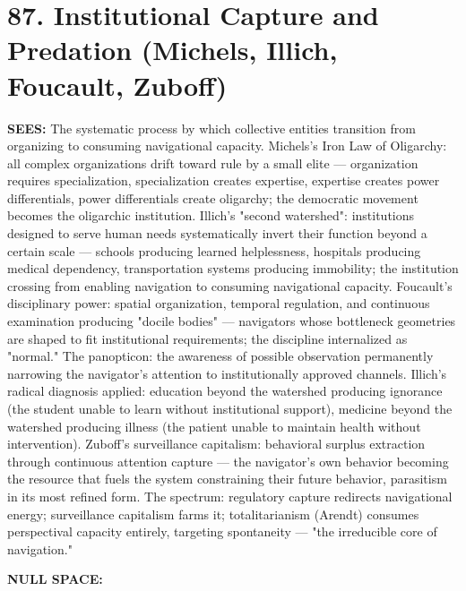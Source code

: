 \section*{87. Institutional Capture and Predation (Michels, Illich, Foucault, Zuboff)}


\textbf{SEES:} The systematic process by which collective entities transition from organizing to consuming navigational capacity. Michels's Iron Law of Oligarchy: all complex organizations drift toward rule by a small elite — organization requires specialization, specialization creates expertise, expertise creates power differentials, power differentials create oligarchy; the democratic movement becomes the oligarchic institution. Illich's "second watershed": institutions designed to serve human needs systematically invert their function beyond a certain scale — schools producing learned helplessness, hospitals producing medical dependency, transportation systems producing immobility; the institution crossing from enabling navigation to consuming navigational capacity. Foucault's disciplinary power: spatial organization, temporal regulation, and continuous examination producing "docile bodies" — navigators whose bottleneck geometries are shaped to fit institutional requirements; the discipline internalized as "normal." The panopticon: the awareness of possible observation permanently narrowing the navigator's attention to institutionally approved channels. Illich's radical diagnosis applied: education beyond the watershed producing ignorance (the student unable to learn without institutional support), medicine beyond the watershed producing illness (the patient unable to maintain health without intervention). Zuboff's surveillance capitalism: behavioral surplus extraction through continuous attention capture — the navigator's own behavior becoming the resource that fuels the system constraining their future behavior, parasitism in its most refined form. The spectrum: regulatory capture redirects navigational energy; surveillance capitalism farms it; totalitarianism (Arendt) consumes perspectival capacity entirely, targeting spontaneity — "the irreducible core of navigation."


\textbf{NULL SPACE:}

